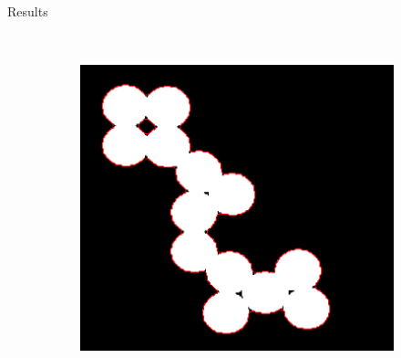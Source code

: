 \documentclass[11pt]{beamer}
\begin{document}
\begin{frame}{Results}
\begin{figure}
\begin{subfigure}[b]{0.36\textwidth}
    \end{subfigure}
    ~ 
        \begin{subfigure}[b]{0.4\textwidth}
        \includegraphics[width=\textwidth]{circles_segmented}

    \end{subfigure}

\end{figure}
\href{run:videos/circles.avi}{}
\end{frame}
\end{document}
